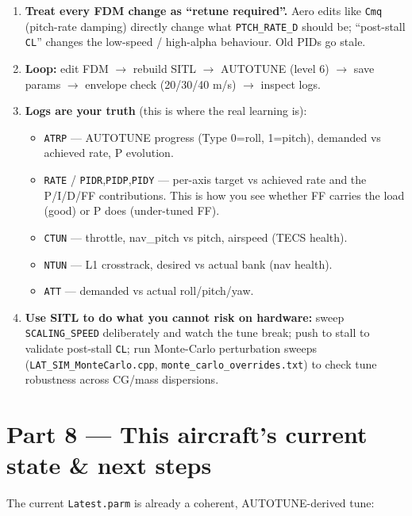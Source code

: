 \documentclass[11pt,a4paper]{article}
\newcommand{\pp}[1]{\texttt{#1}} %
\begin{document}
\begin{enumerate}[leftmargin=1.6em]
  \item \textbf{Treat every FDM change as ``retune required''.} Aero edits like
  \pp{Cmq} (pitch-rate damping) directly change what \pp{PTCH\_RATE\_D} should be;
  ``post-stall \pp{CL}'' changes the low-speed / high-alpha behaviour. Old PIDs go
  stale.
  \item \textbf{Loop:} edit FDM $\rightarrow$ rebuild SITL $\rightarrow$ AUTOTUNE
  (level 6) $\rightarrow$ save params $\rightarrow$ envelope check (20/30/40 m/s)
  $\rightarrow$ inspect logs.
  \item \textbf{Logs are your truth} (this is where the real learning is):
  \begin{itemize}[leftmargin=1.2em]
    \item \pp{ATRP} --- AUTOTUNE progress (Type 0=roll, 1=pitch), demanded vs
    achieved rate, P evolution.
    \item \pp{RATE} / \pp{PIDR},\pp{PIDP},\pp{PIDY} --- per-axis target vs achieved
    rate and the P/I/D/FF contributions. This is how you see whether FF carries the
    load (good) or P does (under-tuned FF).
    \item \pp{CTUN} --- throttle, nav\_pitch vs pitch, airspeed (TECS health).
    \item \pp{NTUN} --- L1 crosstrack, desired vs actual bank (nav health).
    \item \pp{ATT} --- demanded vs actual roll/pitch/yaw.
  \end{itemize}
  \item \textbf{Use SITL to do what you cannot risk on hardware:} sweep
  \pp{SCALING\_SPEED} deliberately and watch the tune break; push to stall to
  validate post-stall \pp{CL}; run Monte-Carlo perturbation sweeps
  (\pp{LAT\_SIM\_MonteCarlo.cpp}, \pp{monte\_carlo\_overrides.txt}) to check tune
  robustness across CG/mass dispersions.
\end{enumerate}

\section{Part 8 --- This aircraft's current state \& next steps}

The current \pp{Latest.parm} is already a coherent, AUTOTUNE-derived tune:
\end{document}
